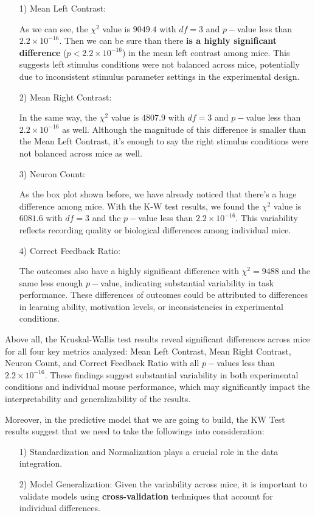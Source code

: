 \documentclass{article}
\begin{document}
	\begin{itemize}
		\item [1)] Mean Left Contrast:
		\par As we can see, the $\chi^2$ value is $9049.4$ with $df = 3$ and $p-$value less than $2.2\times 10^{-16}$. Then we can be sure than there \textbf{is a highly significant difference }($p<2.2\times 10^{-16}$) in the mean left contrast among mice. This suggests left stimulus conditions were not balanced across mice, potentially due to inconsistent stimulus parameter settings in the experimental design.
		\item [2)] Mean Right Contrast:
		\par In the same way, the $\chi^2$ value is $4807.9$ with $df = 3$ and $p-$value less than $2.2\times 10^{-16}$ as well. Although the magnitude of this difference is smaller than the Mean Left Contrast, it's enough to say the right stimulus conditions were not balanced across mice as well.
		\item [3)] Neuron Count:
		\par As the box plot shown before, we have already noticed that there's a huge difference among mice. With the K-W test results, we found the $\chi^2$ value is $6081.6$ with $df = 3$ and the $p-$value less than $2.2\times 10^{-16}$. This variability reflects recording quality or biological differences among individual mice.
		\item [4)] Correct Feedback Ratio:
		\par The outcomes also have a highly significant difference with $\chi^2 = 9488$ and the same less enough $p-$value, indicating substantial variability in task performance. These differences of outcomes could be attributed to differences in learning ability, motivation levels, or inconsistencies in experimental conditions.
	\end{itemize}
	\par Above all, the Kruskal-Wallis test results reveal significant differences across mice for all four key metrics analyzed: Mean Left Contrast, Mean Right Contrast, Neuron Count, and Correct Feedback Ratio with all $p-$values less than $2.2\times 10^{-16}$. These findings suggest substantial variability in both experimental conditions and individual mouse performance, which may significantly impact the interpretability and generalizability of the results.
	\par Moreover, in the predictive model that we are going to build, the KW Test results suggest that we need to take the followings into consideration:
	\begin{itemize}
		\item [1)] Standardization and Normalization plays a crucial role in the data integration.
		\item [2)] Model Generalization: Given the variability across mice, it is important to validate models using \textbf{cross-validation} techniques that account for individual differences.
	\end{itemize}
	\clearpage
\end{document}
